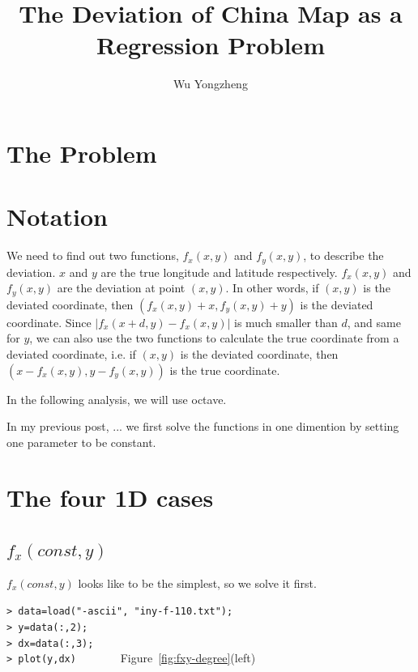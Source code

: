 \documentclass[a4paper]{article}
\begin{document}
\title{The Deviation of China Map as a Regression Problem}
\author{Wu Yongzheng}

\maketitle

\section{The Problem}

\section{Notation}
We need to find out two functions, $f_x(x,y)$ and $f_y(x,y)$, to describe the
deviation. $x$ and $y$ are the true longitude and latitude respectively.
$f_x(x,y)$ and $f_y(x,y)$ are the deviation at point $(x,y)$. In other words,
if $(x,y)$ is the deviated coordinate, then $(f_x(x,y)+x,f_y(x,y)+y)$ is the
deviated coordinate.
Since $|f_x(x+d,y)-f_x(x,y)|$ is much smaller than $d$, and same for $y$,
we can also
use the two functions to calculate the true coordinate from a deviated
coordinate, i.e. if $(x,y)$ is the deviated coordinate, then
$(x-f_x(x,y),y-f_y(x,y))$ is the true coordinate.

In the following analysis, we will use octave.

In my previous post, ... we first solve the functions in one dimention by setting one parameter to be constant.

\section{The four 1D cases}
\subsection{$f_x(const,y)$}
$f_x(const,y)$ looks like to be the simplest, so we solve it first.

\noindent
\verb|> data=load("-ascii", "iny-f-110.txt");| \\
\verb|> y=data(:,2);| \\
\verb|> dx=data(:,3);| \\
\verb|> plot(y,dx)       | \hfill Figure~\ref{fig:fxy-degree}(left)
\end{document}
